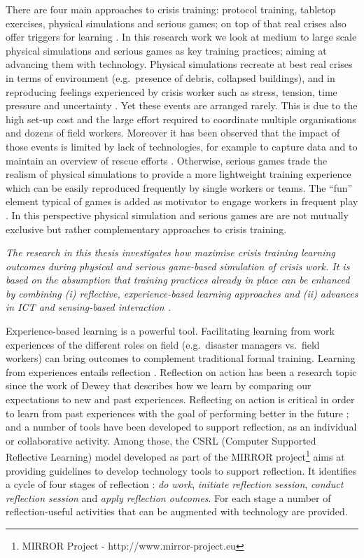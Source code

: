 There are four main approaches to crisis training: protocol training, tabletop exercises, physical simulations and serious games; on top of that real crises also offer triggers for learning \autocite{Deverell:2009fk}. In this research work we look at medium to large scale physical simulations and serious games as key training practices; aiming at advancing them with technology. Physical simulations recreate at best real crises in terms of environment (e.g.~presence of debris, collapsed buildings), and in reproducing feelings experienced by crisis worker such as stress, tension, time pressure and uncertainty \autocite{Borodzicz:2002em}. Yet these events are arranged rarely. This is due to the high set-up cost and the large effort required to coordinate multiple organisations and dozens of field workers. Moreover it has been observed that the impact of those events is limited by lack of technologies, for example to capture data and to maintain an overview of rescue efforts \autocite{Kyng:2006he}. Otherwise, serious games trade the realism of physical simulations to provide a more lightweight training experience which can be easily reproduced frequently by single workers or teams. The ``fun'' element typical of games is added as motivator to engage workers in frequent play \autocite{DiLoreto:2012jj}. In this perspective physical simulation and serious games are are not mutually exclusive but rather complementary approaches to crisis training.

\emph{The research in this thesis investigates how maximise crisis training learning outcomes during physical and serious game-based simulation of crisis work. It is based on the absumption that training practices already in place can be enhanced by combining (i) reflective, experience-based learning approaches and (ii) advances in ICT and sensing-based interaction \autocite{Zhai:2005jm}.}

Experience-based learning is a powerful tool. Facilitating learning from work experiences of the different roles on field (e.g.~disaster managers vs.~field workers) can bring outcomes to complement traditional formal training. Learning from experiences entails reflection \autocites{boud1985reflection}{Dewey:1998ug}{kolb1974toward}. Reflection on action has been a research topic since the work of Dewey \autocite{dewey1933we} that describes how we learn by comparing our expectations to new and past experiences. Reflecting on action is critical in order to learn from past experiences with the goal of performing better in the future \autocites{boud1985reflection}{Schon:1983ut}; and a number of tools have been developed to support reflection, as an individual or collaborative activity. Among those, the CSRL (Computer Supported Reflective Learning) model developed as part of the MIRROR project\footnote{MIRROR Project - http://www.mirror-project.eu} aims at providing guidelines to develop technology tools to support reflection. It identifies a cycle of four stages of reflection \autocite{Krogstie:2013kf}: \emph{do work}, \emph{initiate reflection session}, \emph{conduct reflection session} and \emph{apply reflection outcomes}. For each stage a number of reflection-useful activities that can be augmented with technology are provided.

